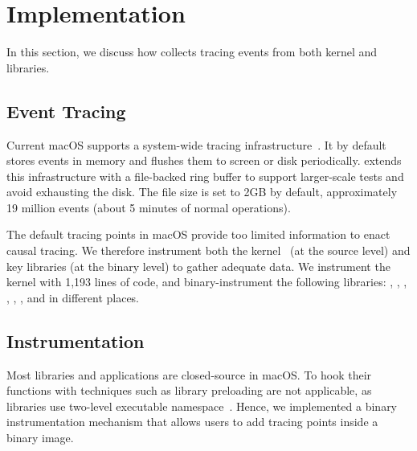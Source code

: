 \section{Implementation}\label{sec:implementation}

In this section, we discuss how \xxx collects tracing events from both kernel
and libraries.

\subsection{Event Tracing}

Current macOS supports a system-wide tracing
infrastructure~\cite{linktotracetool}. It by default stores events in memory and
flushes them to screen or disk periodically. \xxx extends this infrastructure
with a file-backed ring buffer to support larger-scale tests and avoid
exhausting the disk. The file size is set to 2GB by default, approximately 19
million events (about 5 minutes of normal operations).

The default tracing points in macOS provide too limited information
to enact causal tracing. We therefore instrument both the
kernel~\cite{linkofxnusourcecode} (at the source level) and key libraries
(at the binary level) to gather adequate data. We instrument the kernel
with 1,193 lines of code, and binary-instrument the following libraries:
, , ,
, , ,  and
 in \nlibchanges different places.


\subsection{Instrumentation}

Most libraries and applications are closed-source in macOS. To hook their
functions with techniques such as library preloading are not applicable, as
libraries use two-level executable namespace~\cite{twolayernamespace}. Hence, we
implemented a binary instrumentation mechanism that allows users to add tracing
points inside a binary image.

